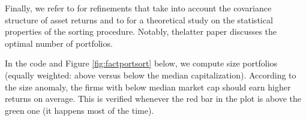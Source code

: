 \documentclass[]{krantz}
\makeatletter
\newenvironment{Shaded}{\begin{snugshade}}{\end{snugshade}}
\newcommand{\CommentTok}[1]{\textcolor[rgb]{0.37,0.37,0.37}{\textit{#1}}}
\newcommand{\DataTypeTok}[1]{\textcolor[rgb]{0.27,0.27,0.27}{#1}}
\newcommand{\DecValTok}[1]{\textcolor[rgb]{0.06,0.06,0.06}{#1}}
\newcommand{\FloatTok}[1]{\textcolor[rgb]{0.06,0.06,0.06}{#1}}
\newcommand{\KeywordTok}[1]{\textcolor[rgb]{0.27,0.27,0.27}{\textbf{#1}}}
\newcommand{\NormalTok}[1]{#1}
\newcommand{\OperatorTok}[1]{\textcolor[rgb]{0.43,0.43,0.43}{\textbf{#1}}}
\newcommand{\StringTok}[1]{\textcolor[rgb]{0.5,0.5,0.5}{#1}}
\newenvironment{kframe}{%
\medskip{}
\setlength{\fboxsep}{.8em}
 \def\at@end@of@kframe{}%
 \ifinner\ifhmode%
  \def\at@end@of@kframe{\end{minipage}}%
  \begin{minipage}{\columnwidth}%
 \fi\fi%
 \def\FrameCommand##1{\hskip\@totalleftmargin \hskip-\fboxsep
 \colorbox{shadecolor}{##1}\hskip-\fboxsep
     \hskip-\linewidth \hskip-\@totalleftmargin \hskip\columnwidth}%
 \MakeFramed {\advance\hsize-\width
   \@totalleftmargin\z@ \linewidth\hsize
   \@setminipage}}%
 {\par\unskip\endMakeFramed%
 \at@end@of@kframe}
\renewenvironment{Shaded}{\begin{kframe}}{\end{kframe}}
\theoremstyle{definition}
\theoremstyle{definition}
\theoremstyle{definition}
\theoremstyle{remark}
\makeatother
\begin{document}
Finally, we refer to \citet{ledoit2018efficient} for refinements that
take into account the covariance structure of asset returns and to
\citet{cattaneo2019characteristic} for a theoretical study on the
statistical properties of the sorting procedure. Notably, thelatter
paper discusses the optimal number of portfolios.

In the code and Figure \ref{fig:factportsort} below, we compute size
portfolios (equally weighted: above versus below the median
capitalization). According to the size anomaly, the firms with below
median market cap should earn higher returns on average. This is
verified whenever the red bar in the plot is above the green one (it
happens most of the time).

\footnotesize

\begin{Shaded}
\end{Shaded}
\end{document}
